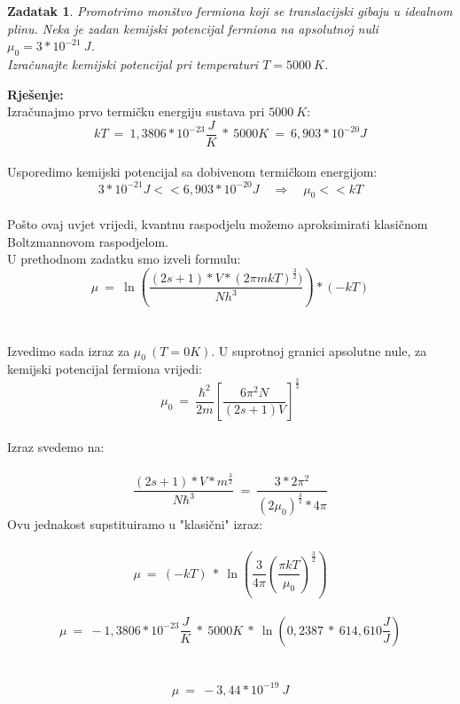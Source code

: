 \documentclass[a4paper,12pt]{article}
\newtheorem{ZDK}{Zadatak}[section]
\begin{document}
\newpage
\begin{ZDK}
	Promotrimo mon\v{s}tvo fermiona koji se translacijski gibaju u idealnom plinu. 
	Neka je zadan kemijski potencijal fermiona na apsolutnoj nuli $\mu_0=3*10^{-21}\ J$. \\
	Izra\v{c}unajte kemijski potencijal pri temperaturi $T=5000\ K$.
\end{ZDK}
\textbf{Rje\v{s}enje:} \\
\newline
Izra\v{c}unajmo prvo termi\v{c}ku energiju sustava pri $5000\ K$:
$$ kT\ =\ 1,3806*10^{-23}\frac{J}{K}\ *\ 5000K\ =\ 6,903*10^{-20}J $$
\\
Usporedimo kemijski potencijal sa dobivenom termi\v{c}kom energijom:
$$ 3*10^{-21}J << 6,903*10^{-20}J \quad \Rightarrow \quad \mu_0 << kT $$
\\
Po\v{s}to ovaj uvjet vrijedi, kvantnu raspodjelu mo\v{z}emo aproksimirati klasi\v{c}nom Boltzmannovom raspodjelom.
\\
U prethodnom zadatku smo izveli formulu:
\\
$$ \mu\ =\ \ln{ \left( \frac{(2s+1)*V*(2 \pi mkT)^{\frac{3}{2}})}{Nh^3} \right) }*(-kT) $$ 
\\
\\
Izvedimo sada izraz za $\mu_0\ (T=0K)$.
U suprotnoj granici apsolutne nule, za kemijski potencijal fermiona vrijedi:
\\
$$ \mu_0\ =\ \frac{\hbar^2}{2m}\left[ \frac{6 \pi^2 N}{(2s+1)V}  \right]^{\frac{2}{3}}  $$
\\
Izraz svedemo na:
\\
\\
$$ \frac{(2s+1)*V*m^{\frac{3}{2}}}{N \hbar^3}\ =\ \frac{3*2 \pi^2}{(2 \mu_0)^{\frac{3}{2}}*4 \pi} $$
\newpage
Ovu jednakost supstituiramo u "klasi\v{c}ni" izraz:
\\
\\
$$ \mu\ =\ (-kT)\ *\ \ln{\left( \frac{3}{4 \pi} \left( \frac{\pi kT}{\mu_0} \right)^{\frac{3}{2}} \right)}  $$
\\
$$ \mu\ =\ -1,3806*10^{-23}\frac{J}{K}\ *\ 5000K\ *\ \ln{ \left(0,2387\ *\ 614,610 \frac{J}{J} \right)} $$
\\
\\
$$ \mu\ =\ -3,44*10^{-19}\ J $$
\end{document}
